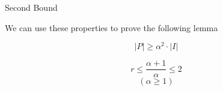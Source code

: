 \begin{frame}{Second Bound}

We can use these properties to prove the following lemma 

\begin{lemma}
$$ |P| \geq \alpha^2 \cdot |I| $$
\end{lemma}

\pause\begin{corollary}
$$ r \leq \frac{\alpha + 1}{\alpha} \leq 2 $$
$$ (\alpha \geq 1)$$
\end{corollary}


\end{frame}

